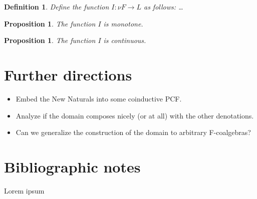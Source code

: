 \documentclass[a4paper]{article}
\newcommand{\arr}{\rightarrow}
\newtheorem{defIMapsNuFToL}[defNuF]{Definition}
\newtheorem{thmIIsMonotone}[defNuF]{Proposition}
\newtheorem{thmIIsContinuous}[defNuF]{Proposition}
\begin{document}
\begin{defIMapsNuFToL}

Define the function $I : \nu F \arr L$ as follows: \ldots

\end{defIMapsNuFToL}


\begin{thmIIsMonotone}

The function $I$ is monotone.

\end{thmIIsMonotone}


\begin{thmIIsContinuous}

The function $I$ is continuous.

\end{thmIIsContinuous}

\section{Further directions}

\begin{itemize}
\item Embed the New Naturals into some coinductive PCF.
\item Analyze if the domain composes nicely (or at all) with the other
denotations.
\item Can we generalize the construction of the domain to arbitrary
F-coalgebras?
\end{itemize}

\section{Bibliographic notes}

Lorem ipsum \cite{Pierce1991} \cite{Gunter1992} \cite{Bird1997}
\cite{Mitchell1996} \cite{Allison1986} \cite{Capretta2002}



\end{document}
